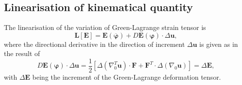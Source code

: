 \subsection{Linearisation of kinematical quantity}
The linearisation of the variation of Green-Lagrange strain tensor is 
\begin{equation}
\mathbf{L}\left[ \mathbf{E} \right] = \mathbf{E}(\overline{\bm{\varphi}}) + D \mathbf{E}(\bm{\varphi}) \cdot \Delta \mathbf{u},
\label{eq:2.17}
\end{equation}
where the directional derivative in the direction of increment $\Delta \mathbf{u}$ is given as in the result of 
\begin{equation}
D \mathbf{E}(\bm{\varphi}) \cdot \Delta\mathbf{u} = \dfrac{1}{2} \left[ \Delta(\nabla_0^T \mathbf{u}) \cdot \mathbf{F} + \mathbf{F}^T \cdot \Delta(\nabla_0 \mathbf{u}) \right] = \Delta \mathbf{E},
\label{eq:2.18}
\end{equation}
with $\Delta\mathbf{E}$ being the increment of the Green-Lagrange deformation tensor.
